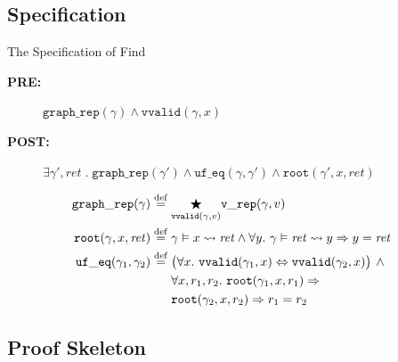 \documentclass[usenames, xcolor=dvipsnames]{beamer}
\newcommand{\defeq}{\mathbin{\overset{\mathrm{def}}{=}}}
\begin{document}
{\subsection{Specification}
\begin{frame}{The Specification of Find}
  \centering
  \colorbox{lightg}{\parbox{.9\textwidth}{
      \begin{description}
      \item[{\bf PRE:}] $\mathtt{graph\_rep}(\gamma) \wedge \mathtt{vvalid}(\gamma, x)$
      \item[{\bf POST:}] $\exists \gamma', \mathit{ret}\;\text{.}\;\mathtt{graph\_rep}(\gamma')\wedge\mathtt{uf\_eq}(\gamma, \gamma') \wedge \mathtt{root}(\gamma', x, \mathit{ret})$
  \end{description}}}
  \pause
  \vskip10pt
  \colorbox{lightg}{\parbox{.9\textwidth}{
      \begin{align*}
        \mathtt{graph\_rep}(\gamma)\;\defeq\; &
        \underset{\mathtt{vvalid}(\gamma, v)}{\bigstar}\mathtt{v\_rep}(\gamma, v)\\
        \mathtt{root}(\gamma, x, \mathit{ret}) \;\defeq\; &\gamma \vDash x \leadsto \mathit{ret} \wedge
        \forall y.~ \gamma \vDash \mathit{ret} \leadsto y \Rightarrow y = \mathit{ret}\\
        \mathtt{uf\_eq}(\gamma_1, \gamma_2)\; \defeq\; &\big(\forall x.~
        \mathtt{vvalid}(\gamma_1, x)\Leftrightarrow \mathtt{vvalid}(\gamma_2,x)\big)
        \, \wedge\, \null\\
        & \forall x, r_1, r_2.~ \mathtt{root}(\gamma_1, x, r_1) \Rightarrow\\
        &\mathtt{root}(\gamma_2, x, r_2) \Rightarrow r_1 = r_2
      \end{align*}
    }}
\end{frame}

\subsection{Proof Skeleton}

}
\end{document}
